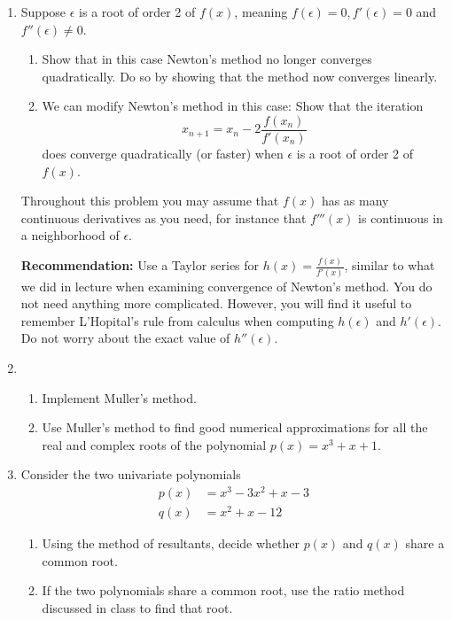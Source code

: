 \documentclass[conference,onecolumn]{IEEEtran}
\begin{document}
\begin{enumerate}[label=\arabic{enumi}.]
          \clearpage
    \item Suppose $\epsilon$ is a root of order 2 of $f(x)$, meaning $f(\epsilon) = 0, f'(\epsilon) = 0$ and $f''(\epsilon) \neq 0$.
          \begin{enumerate}
              \item Show that in this case Newton's method no longer converges quadratically.
                    Do so by showing that the method now converges linearly.
              \item We can modify Newton's method in this case: Show that the iteration
                    $$
                        x_{n+1} = x_n - 2 \frac{f(x_n)}{f'(x_n)}
                    $$
                    does converge quadratically (or faster) when $\epsilon$ is a root of order 2 of $f(x)$.
          \end{enumerate}
          Throughout this problem you may assume that $f(x)$ has as many continuous derivatives as you need, for instance that $f'''(x)$ is continuous in a neighborhood of $\epsilon$.

          \textbf{Recommendation:} Use a Taylor series for $h(x) = \frac{f (x)}{f'(x)}$, similar to what we did in lecture when examining convergence of Newton's method.
          You do not need anything more complicated.
          However, you will find it useful to remember L'Hopital's rule from calculus when computing $h(\epsilon)$ and $h'(\epsilon)$.
          Do not worry about the exact value of $h''(\epsilon)$.

          \clearpage
    \item
          \begin{enumerate}
              \item Implement Muller's method.
              \item Use Muller's method to find good numerical approximations for all the real and complex roots of the polynomial $p(x) = x^3 + x + 1$.
          \end{enumerate}

          \clearpage
    \item Consider the two univariate polynomials
          \begin{align*}
              p(x) & = x^3 - 3 x^2 + x - 3 \\
              q(x) & = x^2 + x - 12
          \end{align*}

          \begin{enumerate}
              \item Using the method of resultants, decide whether $p(x)$ and $q(x)$ share a common root.
              \item If the two polynomials share a common root, use the ratio method discussed in class to find that root.
          \end{enumerate}


\end{enumerate}
\end{document}
